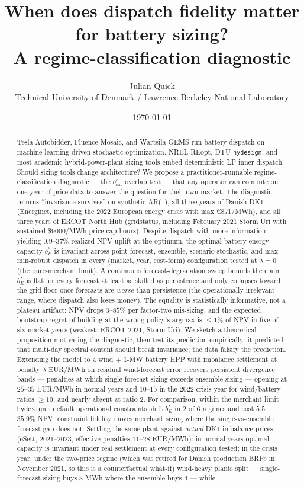 \documentclass[11pt]{article}
\title{When does dispatch fidelity matter for battery sizing?\\
A regime-classification diagnostic}
\author{Julian Quick \\ \small{Technical University of Denmark / Lawrence Berkeley National Laboratory}}
\date{\today}
\begin{document}
\maketitle

\begin{abstract}
Tesla Autobidder, Fluence Mosaic, and W\"{a}rtsil\"{a} GEMS run battery dispatch on machine-learning-driven stochastic optimization. NREL REopt, DTU \texttt{hydesign}, and most academic hybrid-power-plant sizing tools embed deterministic LP inner dispatch. Should sizing tools change architecture? We propose a practitioner-runnable regime-classification diagnostic --- the $b_{\mathrm{sat}}^{\epsilon}$ overlap test --- that any operator can compute on one year of price data to answer the question for their own market. The diagnostic returns ``invariance survives'' on synthetic AR(1), all three years of Danish DK1 (Energinet, including the 2022 European energy crisis with max \euro 871/MWh), and all three years of ERCOT North Hub (gridstatus, including February 2021 Storm Uri with sustained \$9000/MWh price-cap hours). Despite dispatch with more information yielding $0.9$--$37\%$ realized-NPV uplift at the optimum, the optimal battery energy capacity $b_E^*$ is invariant across point-forecast, ensemble, scenario-stochastic, and max-min-robust dispatch in every (market, year, cost-form) configuration tested at $\lambda = 0$ (the pure-merchant limit). A continuous forecast-degradation sweep bounds the claim: $b_E^*$ is flat for every forecast at least as skilled as persistence and only collapses toward the grid floor once forecasts are \emph{worse} than persistence (the operationally-irrelevant range, where dispatch also loses money). The equality is statistically informative, not a plateau artifact: NPV drops $3$--$85\%$ per factor-two mis-sizing, and the expected bootstrap regret of building at the wrong policy's argmax is $\leq 1\%$ of NPV in five of six market-years (weakest: ERCOT 2021, Storm Uri). We sketch a theoretical proposition motivating the diagnostic, then test its prediction empirically: it predicted that multi-day spectral content should break invariance; the data falsify the prediction. Extending the model to a wind + 1-MW battery HPP with imbalance settlement at penalty $\lambda$ EUR/MWh on residual wind-forecast error recovers persistent divergence bands --- penalties at which single-forecast sizing exceeds ensemble sizing --- opening at $25$--$35$ EUR/MWh in normal years and $10$--$15$ in the 2022 crisis year for wind/battery ratios $\geq 10$, and nearly absent at ratio 2. For comparison, within the merchant limit \texttt{hydesign}'s default operational constraints shift $b_E^*$ in 2 of 6 regimes and cost $5.5$--$35.9\%$ NPV: constraint fidelity moves merchant sizing where the single-vs-ensemble forecast gap does not. Settling the same plant against \emph{actual} DK1 imbalance prices (eSett, 2021--2023, effective penalties $11$--$28$ EUR/MWh): in normal years optimal capacity is invariant under real settlement at every configuration tested; in the crisis year, under the two-price regime (which was retired for Danish production BRPs in November 2021, so this is a counterfactual what-if) wind-heavy plants split --- single-forecast sizing buys $8$ MWh where the ensemble buys $4$ --- while 
\end{abstract}
\end{document}
